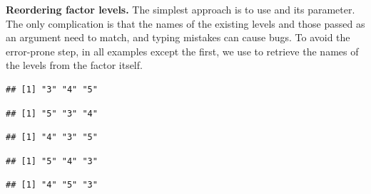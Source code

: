 \documentclass[krantz2]{krantz}\usepackage{knitr}
\begin{document}
\begin{explainbox}
\textbf{Reordering factor levels.} The simplest approach is to use  and its  parameter. The only complication is that the names of the existing levels and those passed as an argument need to match, and typing mistakes can cause bugs. To avoid the error-prone step, in all examples except the first, we use  to retrieve the names of the levels from the factor itself.

\begin{knitrout}\footnotesize
{}\color{fgcolor}\begin{kframe}
\begin{alltt}
\end{alltt}
\begin{verbatim}
## [1] "3" "4" "5"
\end{verbatim}
\begin{alltt}
 \hlkwb{<-}   \hlstd{=} \hlstd{(}\hlstd{,} \hlstd{,} \hlstd{))}
\end{alltt}
\begin{verbatim}
## [1] "5" "3" "4"
\end{verbatim}
\begin{alltt}
 \hlkwb{<-}   \hlstd{=} \hlstd{(}
\end{alltt}
\begin{verbatim}
## [1] "4" "3" "5"
\end{verbatim}
\end{kframe}
\end{knitrout}

\begin{knitrout}\footnotesize
{}\color{fgcolor}\begin{kframe}
\begin{alltt}
 \hlkwb{<-} 
                      \hlstd{=} \hlstd{(}  \hlstd{=} \hlstd{))}
\end{alltt}
\begin{verbatim}
## [1] "5" "4" "3"
\end{verbatim}
\begin{alltt}
 \hlkwb{<-}   \hlstd{=} \hlstd{(my.factor2)[}\hlstd{(}\hlstd{,} \hlstd{,} \hlstd{)])}
\end{alltt}
\begin{verbatim}
## [1] "4" "5" "3"
\end{verbatim}
\end{kframe}
\end{knitrout}


\end{explainbox}
\end{document}
